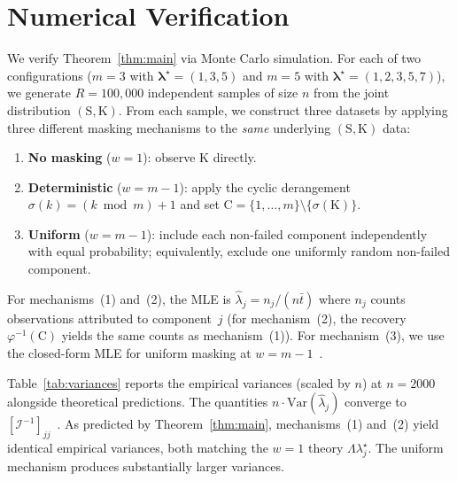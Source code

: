 \documentclass[preprint,12pt]{elsarticle}
\newcommand{\RV}[1]{\mathrm{#1}}
\newcommand{\sv}{\RV{S}}           %
\newcommand{\cand}{\RV{C}}         %
\newcommand{\tparam}[1]{{#1}^{\star}}  %
\newcommand{\estimator}[1]{\hat{#1}}   %
\newcommand{\infomatrx}{\mathcal{I}}
\renewcommand{\vec}[1]{\boldsymbol{#1}}
\theoremstyle{definition}
\theoremstyle{remark}
\begin{document}
\section{Numerical Verification}
\label{sec:numerical}

We verify Theorem~\ref{thm:main} via Monte Carlo simulation. For each of two
configurations ($m=3$ with $\tparam{\vec\lambda} = (1,3,5)$ and $m=5$ with
$\tparam{\vec\lambda} = (1,2,3,5,7)$), we generate $R = 100{,}000$ independent
samples of size $n$ from the joint distribution $(\sv, \RV{K})$. From each
sample, we construct three datasets by applying three different masking
mechanisms to the \emph{same} underlying $(\sv, \RV{K})$ data:
\begin{enumerate}
\item \textbf{No masking} ($w=1$): observe $\RV{K}$ directly.
\item \textbf{Deterministic} ($w=m-1$): apply the cyclic derangement
  $\sigma(k) = (k \bmod m) + 1$ and set
  $\cand = \{1,\ldots,m\}\setminus\{\sigma(\RV{K})\}$.
\item \textbf{Uniform} ($w=m-1$): include each non-failed component
  independently with equal probability; equivalently, exclude one uniformly
  random non-failed component.
\end{enumerate}

For mechanisms~(1) and~(2), the MLE is
$\estimator{\lambda}_j = n_j / (n\bar{t})$ where $n_j$ counts observations
attributed to component~$j$ (for mechanism~(2), the recovery
$\varphi^{-1}(\cand)$ yields the same counts as mechanism~(1)). For
mechanism~(3), we use the closed-form MLE for uniform masking at
$w=m-1$~\cite{towell2025expo}.

Table~\ref{tab:variances} reports the empirical variances (scaled by $n$) at
$n = 2000$ alongside theoretical predictions. The quantities $n \cdot
\mathrm{Var}(\estimator{\lambda}_j)$ converge to
$[\infomatrx^{-1}]_{jj}$~\cite{bickel}. As predicted by
Theorem~\ref{thm:main}, mechanisms~(1) and~(2) yield identical empirical
variances, both matching the $w=1$ theory $\Lambda \tparam{\lambda}_j$. The
uniform mechanism produces substantially larger variances.
\end{document}
